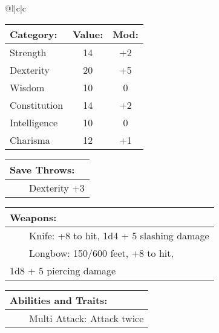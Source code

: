 \documentclass[11pt]{article}
\newcommand{\tabitem}{~~\llap{--}~~}
\begin{document}
\begin{multicols}{2}
\noindent \begin{tabularx}{\linewidth}{@{}l|c|c}
 \\
\hline
		\end{tabularx}
\noindent \begin{tabular}{@{}l|c|c}
\textbf{Category:} 			& \textbf{Value:} 	& \textbf{Mod:} \\
\hline
Strength 					& 14				& +2		\\
Dexterity 					& 20 				& +5		\\
Wisdom 						& 10				& 0			\\
Constitution 				& 14 				& +2		\\
Intelligence 				& 10		 		& 0			\\
Charisma 					& 12		 		& +1
		\end{tabular}

\vspace{4mm}

\noindent \begin{tabularx}{\linewidth}{@{}l}
{\Large \textbf{Save Throws:}} \\
\hline
\tabitem Dexterity +3
		\end{tabularx}

\vspace{4mm}

\noindent \begin{tabularx}{\linewidth}{@{}l}
{\Large \textbf{Weapons:}} \\
\hline
\tabitem Knife: +8 to hit, 1d4 + 5 slashing damage \\
\tabitem Longbow: 150/600 feet, +8 to hit, \\
1d8 + 5 piercing damage
		\end{tabularx}

\vspace{4mm}

\noindent \begin{tabularx}{\linewidth}{@{}l}
{\Large \textbf{Abilities and Traits:}} \\
\hline
\tabitem Multi Attack: Attack twice \\
		\end{tabularx}
	\end{multicols}
\end{document}

